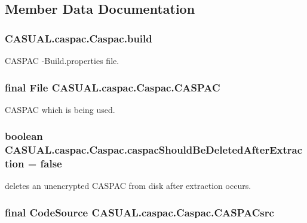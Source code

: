 \subsection{Member Data Documentation}
\hypertarget{class_c_a_s_u_a_l_1_1caspac_1_1_caspac_ace7ae4866f3cd239e653518559bd0eb1}{
\subsubsection[{build}]{ C\-A\-S\-U\-A\-L.\-caspac.\-Caspac.\-build}}\label{class_c_a_s_u_a_l_1_1caspac_1_1_caspac_ace7ae4866f3cd239e653518559bd0eb1}
C\-A\-S\-P\-A\-C -\/\-Build.\-properties file. \hypertarget{class_c_a_s_u_a_l_1_1caspac_1_1_caspac_a6e5addab168b4b657c6b56c85b303775}{
\subsubsection[{C\-A\-S\-P\-A\-C}]{\setlength{\rightskip}{0pt plus 5cm}final File C\-A\-S\-U\-A\-L.\-caspac.\-Caspac.\-C\-A\-S\-P\-A\-C}}\label{class_c_a_s_u_a_l_1_1caspac_1_1_caspac_a6e5addab168b4b657c6b56c85b303775}
C\-A\-S\-P\-A\-C which is being used. \hypertarget{class_c_a_s_u_a_l_1_1caspac_1_1_caspac_a2c6cceeb53d5c07779badc9260b8233d}{
\subsubsection[{caspac\-Should\-Be\-Deleted\-After\-Extraction}]{\setlength{\rightskip}{0pt plus 5cm}boolean C\-A\-S\-U\-A\-L.\-caspac.\-Caspac.\-caspac\-Should\-Be\-Deleted\-After\-Extraction = false}}\label{class_c_a_s_u_a_l_1_1caspac_1_1_caspac_a2c6cceeb53d5c07779badc9260b8233d}
deletes an unencrypted C\-A\-S\-P\-A\-C from disk after extraction occurs. \hypertarget{class_c_a_s_u_a_l_1_1caspac_1_1_caspac_a708e3c668e09d5901e8e2fdb94aa642a}{
\subsubsection[{C\-A\-S\-P\-A\-Csrc}]{\setlength{\rightskip}{0pt plus 5cm}final Code\-Source C\-A\-S\-U\-A\-L.\-caspac.\-Caspac.\-C\-A\-S\-P\-A\-Csrc}}\label{class_c_a_s_u_a_l_1_1caspac_1_1_caspac_a708e3c668e09d5901e8e2fdb94aa642a}
